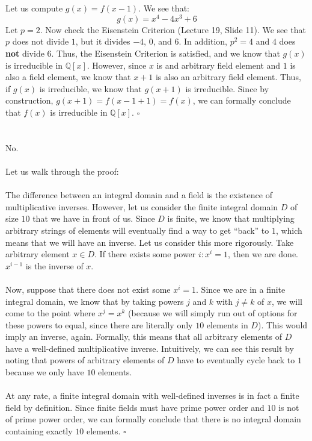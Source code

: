 \documentclass[letterpaper]{article}
\newcommand*{\QED}{\hfill\ensuremath{\square}}%
\begin{document}
\section{}
\label{sec:Question4}

Let us compute $ g(x) = f(x - 1) $.
We see that:
\[
g(x) = x^4 - 4x^3 + 6
\]
Let $ p = 2 $.
Now check the Eisenstein Criterion (Lecture 19, Slide 11).
We see that $ p $ does not divide $ 1 $, but it divides $ -4 $, $ 0 $, and $ 6 $.
In addition, $ p^2 = 4 $ and $ 4 $ does \textbf{not} divide $ 6 $.
Thus, the Eisenstein Criterion is satisfied, and we know that $ g(x) $ is irreducible in $ \mathbb{Q}[x] $.
However, since $ x $ is and arbitrary field element and $ 1 $ is also a field element, we know that $ x + 1 $ is also an arbitrary field element.
Thus, if $ g(x) $ is irreducible, we know that $ g(x + 1) $ is irreducible.
Since by construction, $ g(x + 1) = f(x - 1 + 1) = f(x) $, we can formally conclude that $ f(x) $ is irreducible in $ \mathbb{Q}[x] $.
\QED{}

\section{}
\label{sec:Question5}
No.
\\ \\
Let us walk through the proof:
\\ \\
The difference between an integral domain and a field is the existence of multiplicative inverses.
However, let us consider the finite integral domain $ D $ of size $ 10 $ that we have in front of us.
Since $ D $ is finite, we know that multiplying arbitrary strings of elements will eventually find a way to get ``back'' to $ 1 $, which means that we will have an inverse.
Let us consider this more rigorously.
Take arbitrary element $ x \in D $.
If there exists some power $ i : x^i = 1 $, then we are done.
$ x^{i - 1} $ is the inverse of $ x $.
\\ \\
Now, suppose that there does not exist some $ x^{i} = 1 $.
Since we are in a finite integral domain, we know that by taking powers $ j $ and $ k $ with $ j \neq k $ of $ x $, we will come to the point where $ x^j = x^k $ (because we will simply run out of options for these powers to equal, since there are literally only $ 10 $ elements in $ D $).
This would imply an inverse, again.
Formally, this means that all arbitrary elements of $ D $ have a well-defined multiplicative inverse.
Intuitively, we can see this result by noting that powers of arbitrary elements of $ D $ have to eventually cycle back to $ 1 $ because we only have $ 10 $ elements.
\\ \\
At any rate, a finite integral domain with well-defined inverses is in fact a finite field by definition.
Since finite fields must have prime power order and $ 10 $ is not of prime power order, we can formally conclude that there is no integral domain containing exactly $ 10 $ elements.
\QED{}
\end{document}
